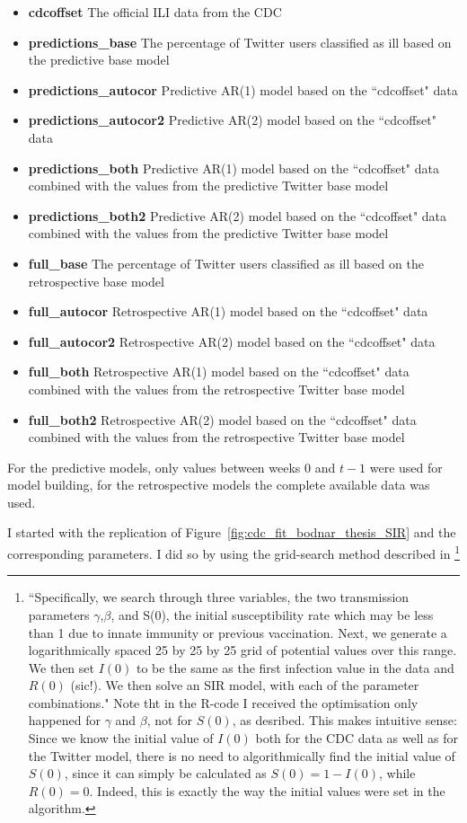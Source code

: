 \documentclass[11pt, a4paper,twoside]{report}\usepackage[]{graphicx}\usepackage[]{color}
\begin{document}
\begin{itemize}
  \item \textbf{cdcoffset} The official ILI data from the CDC
  \item \textbf{predictions\_base} The percentage of Twitter users classified as ill based on the predictive base model
  \item \textbf{predictions\_autocor} Predictive AR(1) model based on the ``cdcoffset" data
  \item \textbf{predictions\_autocor2} Predictive AR(2) model based on the ``cdcoffset" data
  \item \textbf{predictions\_both} Predictive AR(1) model based on the ``cdcoffset" data combined with the values from the predictive Twitter base model
  \item \textbf{predictions\_both2} Predictive AR(2) model based on the ``cdcoffset" data combined with the values from the predictive Twitter base model
 \item \textbf{full\_base} The percentage of Twitter users classified as ill based on the retrospective base model
  \item \textbf{full\_autocor} Retrospective AR(1) model based on the ``cdcoffset" data
  \item \textbf{full\_autocor2} Retrospective AR(2) model based on the ``cdcoffset" data
  \item \textbf{full\_both} Retrospective AR(1) model based on the ``cdcoffset" data combined with the values from the retrospective Twitter base model
  \item \textbf{full\_both2} Retrospective AR(2) model based on the ``cdcoffset" data combined with the values from the retrospective Twitter base model
\end{itemize}

For the predictive models, only values between weeks $0$ and $t-1$ were used for model building, for the retrospective models the complete available data was used.\newline

I started with the replication of Figure~\ref{fig:cdc_fit_bodnar_thesis_SIR} and the corresponding parameters. I did so by using the grid-search method described in \citep{bodnar_data_2015}\footnote{``Specifically, we
search through three variables, the two transmission parameters $\gamma$,$\beta$, and S(0), the initial susceptibility rate which may be less than 1 due to innate immunity or previous vaccination. Next, we generate a logarithmically spaced 25 by 25 by 25 grid of potential values over this range. We then set $I(0)$ to be the same as the first infection value in the data and $R(0)$ (sic!). We then solve an SIR model, with each of the parameter combinations." Note tht in the R-code I received the optimisation only happened for $\gamma$ and $\beta$, not for $S(0)$, as desribed. This makes intuitive sense: Since we know the initial value of $I(0)$ both for the CDC data as well as for the Twitter model, there is no need to algorithmically find the initial value of $S(0)$, since it can simply be calculated as $S(0)=1-I(0)$, while $R(0)=0$. Indeed, this is exactly the way the initial values were set in the algorithm.}\newline
\end{document}
